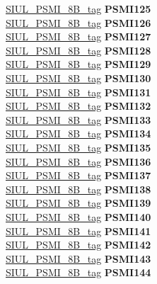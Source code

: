 \begin{DoxyCompactItemize}
\begin{tabbing}
\>\>\mbox{\hyperlink{unionSIUL__PSMI__8B__tag}{SIUL\_PSMI\_8B\_tag}} {\bfseries PSMI125}\\
\>\>\mbox{\hyperlink{unionSIUL__PSMI__8B__tag}{SIUL\_PSMI\_8B\_tag}} {\bfseries PSMI126}\\
\>\>\mbox{\hyperlink{unionSIUL__PSMI__8B__tag}{SIUL\_PSMI\_8B\_tag}} {\bfseries PSMI127}\\
\>\>\mbox{\hyperlink{unionSIUL__PSMI__8B__tag}{SIUL\_PSMI\_8B\_tag}} {\bfseries PSMI128}\\
\>\>\mbox{\hyperlink{unionSIUL__PSMI__8B__tag}{SIUL\_PSMI\_8B\_tag}} {\bfseries PSMI129}\\
\>\>\mbox{\hyperlink{unionSIUL__PSMI__8B__tag}{SIUL\_PSMI\_8B\_tag}} {\bfseries PSMI130}\\
\>\>\mbox{\hyperlink{unionSIUL__PSMI__8B__tag}{SIUL\_PSMI\_8B\_tag}} {\bfseries PSMI131}\\
\>\>\mbox{\hyperlink{unionSIUL__PSMI__8B__tag}{SIUL\_PSMI\_8B\_tag}} {\bfseries PSMI132}\\
\>\>\mbox{\hyperlink{unionSIUL__PSMI__8B__tag}{SIUL\_PSMI\_8B\_tag}} {\bfseries PSMI133}\\
\>\>\mbox{\hyperlink{unionSIUL__PSMI__8B__tag}{SIUL\_PSMI\_8B\_tag}} {\bfseries PSMI134}\\
\>\>\mbox{\hyperlink{unionSIUL__PSMI__8B__tag}{SIUL\_PSMI\_8B\_tag}} {\bfseries PSMI135}\\
\>\>\mbox{\hyperlink{unionSIUL__PSMI__8B__tag}{SIUL\_PSMI\_8B\_tag}} {\bfseries PSMI136}\\
\>\>\mbox{\hyperlink{unionSIUL__PSMI__8B__tag}{SIUL\_PSMI\_8B\_tag}} {\bfseries PSMI137}\\
\>\>\mbox{\hyperlink{unionSIUL__PSMI__8B__tag}{SIUL\_PSMI\_8B\_tag}} {\bfseries PSMI138}\\
\>\>\mbox{\hyperlink{unionSIUL__PSMI__8B__tag}{SIUL\_PSMI\_8B\_tag}} {\bfseries PSMI139}\\
\>\>\mbox{\hyperlink{unionSIUL__PSMI__8B__tag}{SIUL\_PSMI\_8B\_tag}} {\bfseries PSMI140}\\
\>\>\mbox{\hyperlink{unionSIUL__PSMI__8B__tag}{SIUL\_PSMI\_8B\_tag}} {\bfseries PSMI141}\\
\>\>\mbox{\hyperlink{unionSIUL__PSMI__8B__tag}{SIUL\_PSMI\_8B\_tag}} {\bfseries PSMI142}\\
\>\>\mbox{\hyperlink{unionSIUL__PSMI__8B__tag}{SIUL\_PSMI\_8B\_tag}} {\bfseries PSMI143}\\
\>\>\mbox{\hyperlink{unionSIUL__PSMI__8B__tag}{SIUL\_PSMI\_8B\_tag}} {\bfseries PSMI144}\\

\end{tabbing}
\end{DoxyCompactItemize}

